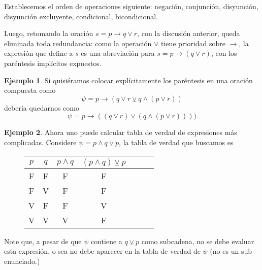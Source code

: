 \documentclass{book}
\theoremstyle{definition}
\newtheorem{ejm}{Ejemplo}[chapter]
\begin{document}
Establecemos el orden de operaciones siguiente: negación, conjunción, disyunción, disyunción excluyente, condicional, bicondicional.

Luego, retomando la oración $s=p\rightarrow q \vee r$, con la discusión anterior, queda eliminada toda redundancia: como la operación $\vee$ tiene prioridad sobre $\rightarrow$, la expresión que define a $s$ es una abreviación para $s=p\rightarrow (q \vee r)$, con los paréntesis implícitos expuestos.

\begin{ejm}
	Si quisiéramos colocar explícitamente los paréntesis en una oración compuesta como \[\psi = p \rightarrow (q \vee r \veebar q \wedge (p \vee r)) \]
	debería quedarnos como
	\[\psi = p \rightarrow ((q \vee r) \veebar (q \wedge (p \vee r)))) \]
\end{ejm}

\begin{ejm}
	Ahora uno puede calcular tabla de verdad de expresiones más complicadas. Considere $\psi = p \wedge q\veebar p$, la tabla de verdad que buscamos es
	\begin{figure}[h]
		\begin{center}\begin{tabular}{|c|c||c|c|c|c|c|}
				\hline 
				$p$& $q$ & $p \wedge q $ & $(p \wedge q) \veebar p$ \\
				\hline \hline
				F & F & F & F \\
				\hline
				F & V & F & F \\
				\hline
				V & F & F & V \\
				\hline
				V & V & V & F \\
				\hline
	\end{tabular}\end{center}\end{figure}
	
	Note que, a pesar de que $\psi$ contiene a $q\veebar p$ como subcadena, no se debe evaluar esta expresión, o sea no debe aparecer en la tabla de verdad de $\psi$ (no es un sub-enunciado.)
\end{ejm}
\end{document}

